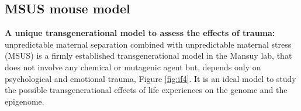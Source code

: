 \documentclass[12pt,twoside]{reedthesis}
\begin{document}
\hypertarget{msus-mouse-model}{%
\subsection*{MSUS mouse model}\label{msus-mouse-model}}

\textbf{A unique transgenerational model to assess the effects of trauma:}
unpredictable maternal separation combined with unpredictable maternal
stress (MSUS) is a firmly established transgenerational model in the
Mansuy lab, that does not involve any chemical or mutagenic agent but,
depends only on psychological and emotional trauma, Figure \ref{fig:if4}. It is an
ideal model to study the possible transgenerational effects of life
experiences on the genome and the epigenome.
\end{document}
